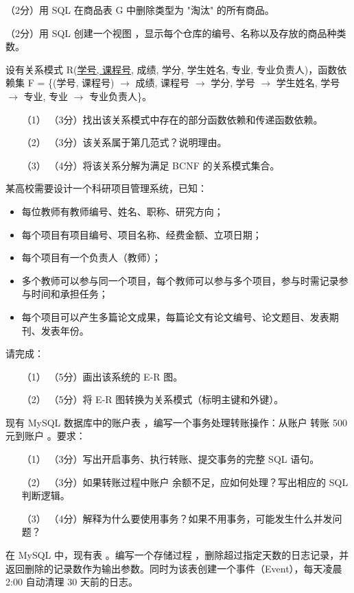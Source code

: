 \documentclass[a4paper,11pt]{article}
\begin{document}
\q （2分）用 SQL 在商品表 G 中删除类型为 "淘汰" 的所有商品。
\anslines{0.8cm}

\q （2分）用 SQL 创建一个视图 ，显示每个仓库的编号、名称以及存放的商品种类数。
\anslines{1.2cm}


\q 设有关系模式 R(\underline{学号, 课程号}, 成绩, 学分, 学生姓名, 专业, 专业负责人)，函数依赖集 F = \{(学号, 课程号) $\rightarrow$ 成绩, 课程号 $\rightarrow$ 学分, 学号 $\rightarrow$ 学生姓名, 学号 $\rightarrow$ 专业, 专业 $\rightarrow$ 专业负责人\}。
\begin{enumerate}[leftmargin=2em, itemsep=3pt]
  \item[（1）] （3分）找出该关系模式中存在的部分函数依赖和传递函数依赖。
  \item[（2）] （3分）该关系属于第几范式？说明理由。
  \item[（3）] （4分）将该关系分解为满足 BCNF 的关系模式集合。
\end{enumerate}
\anslines{4cm}


\q 某高校需要设计一个科研项目管理系统，已知：
\begin{itemize}
  \item 每位教师有教师编号、姓名、职称、研究方向；
  \item 每个项目有项目编号、项目名称、经费金额、立项日期；
  \item 每个项目有一个负责人（教师）；
  \item 多个教师可以参与同一个项目，每个教师可以参与多个项目，参与时需记录参与时间和承担任务；
  \item 每个项目可以产生多篇论文成果，每篇论文有论文编号、论文题目、发表期刊、发表年份。
\end{itemize}
请完成：
\begin{enumerate}[leftmargin=2em, itemsep=3pt]
  \item[（1）] （5分）画出该系统的 E-R 图。
  \item[（2）] （5分）将 E-R 图转换为关系模式（标明主键和外键）。
\end{enumerate}
\anslines{5cm}


\q 现有 MySQL 数据库中的账户表 ，编写一个事务处理转账操作：从账户  转账 500 元到账户 。要求：
\begin{enumerate}[leftmargin=2em, itemsep=3pt]
  \item[（1）] （3分）写出开启事务、执行转账、提交事务的完整 SQL 语句。
  \item[（2）] （3分）如果转账过程中账户  余额不足，应如何处理？写出相应的 SQL 判断逻辑。
  \item[（3）] （4分）解释为什么要使用事务？如果不用事务，可能发生什么并发问题？
\end{enumerate}
\anslines{3.5cm}

\q 在 MySQL 中，现有表 。编写一个存储过程 ，删除超过指定天数的日志记录，并返回删除的记录数作为输出参数。同时为该表创建一个事件（Event），每天凌晨 2:00 自动清理 30 天前的日志。
\anslines{4cm}
\end{document}
